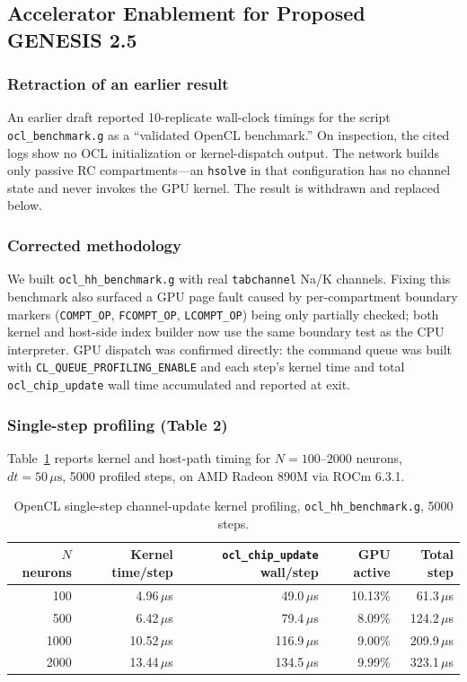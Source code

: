 \documentclass[11pt,a4paper]{article}
\begin{document}
\subsection{Accelerator Enablement for Proposed GENESIS 2.5}
\label{sec:ocl}

\subsubsection*{Retraction of an earlier result}

An earlier draft reported 10-replicate wall-clock timings for the script \texttt{ocl\_benchmark.g} as a ``validated OpenCL benchmark.'' On inspection, the cited logs show no OCL initialization or kernel-dispatch output. The network builds only passive RC compartments---an \texttt{hsolve} in that configuration has no channel state and never invokes the GPU kernel. The result is withdrawn and replaced below.

\subsubsection*{Corrected methodology}

We built \texttt{ocl\_hh\_benchmark.g} with real \texttt{tabchannel} Na/K channels. Fixing this benchmark also surfaced a GPU page fault caused by per-compartment boundary markers (\texttt{COMPT\_OP}, \texttt{FCOMPT\_OP}, \texttt{LCOMPT\_OP}) being only partially checked; both kernel and host-side index builder now use the same boundary test as the CPU interpreter. GPU dispatch was confirmed directly: the command queue was built with \texttt{CL\_QUEUE\_PROFILING\_ENABLE} and each step's kernel time and total \texttt{ocl\_chip\_update} wall time accumulated and reported at exit.

\subsubsection*{Single-step profiling (Table 2)}

Table~\ref{tab:ocl_profile} reports kernel and host-path timing for $N = 100$--$2000$ neurons, $dt = 50\,\mu\text{s}$, 5000 profiled steps, on AMD Radeon 890M via ROCm 6.3.1.

\begin{table}[H]
\centering
\caption{OpenCL single-step channel-update kernel profiling, \texttt{ocl\_hh\_benchmark.g}, 5000 steps.}
\label{tab:ocl_profile}
\begin{tabular}{rrrrr}
\toprule
$N$ neurons & Kernel time/step & \texttt{ocl\_chip\_update} wall/step & GPU active & Total step \\
\midrule
100  & 4.96\,$\mu$s  & 49.0\,$\mu$s  & 10.13\% & 61.3\,$\mu$s \\
500  & 6.42\,$\mu$s  & 79.4\,$\mu$s  &  8.09\% & 124.2\,$\mu$s \\
1000 & 10.52\,$\mu$s & 116.9\,$\mu$s &  9.00\% & 209.9\,$\mu$s \\
2000 & 13.44\,$\mu$s & 134.5\,$\mu$s &  9.99\% & 323.1\,$\mu$s \\
\bottomrule
\end{tabular}
\end{table}
\end{document}
